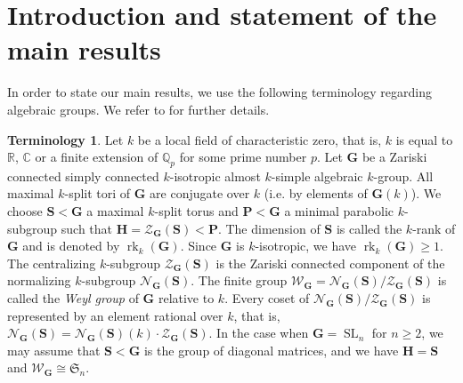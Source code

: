 \documentclass[11pt]{amsart}
\numberwithin{equation}{section}
\theoremstyle{plain}
\theoremstyle{definition}
\newtheorem*{terminology}{Terminology}
\newcommand{\R}{\mathbb{R}}
\newcommand{\C}{\mathbb{C}}
\newcommand{\Q}{\mathbb{Q}}
\newcommand{\SL}{\operatorname{SL}}
\newcommand{\rk}{\operatorname{rk}}
\begin{document}
\section{Introduction and statement of the main results}

In order to state our main results, we use the following terminology regarding algebraic groups. We refer to \cite{Bo91, Ma91} for further details.


\begin{terminology}
Let $k$ be a local field of characteristic zero, that is, $k$ is equal to $\R$, $\C$ or a finite extension of $\Q_p$ for some prime number $p$. Let $\mathbf G$ be a Zariski connected simply connected $k$-isotropic almost $k$-simple algebraic $k$-group. All maximal $k$-split tori of $\mathbf G$ are conjugate over $k$ (i.e.\! by elements of $\mathbf G(k)$). We choose $\mathbf S < \mathbf G$ a maximal $k$-split torus and $\mathbf P < \mathbf G$ a minimal parabolic $k$-subgroup such that $\mathbf H = \mathscr Z_{\mathbf G}(\mathbf S) < \mathbf P$. The dimension of $\mathbf S$ is called the $k$-rank of $\mathbf G$ and is denoted by $\rk_k(\mathbf G)$. Since $\mathbf G$ is $k$-isotropic, we have $\rk_k(\mathbf G) \geq 1$. The centralizing $k$-subgroup $\mathscr Z_{\mathbf G}(\mathbf S)$ is the Zariski connected component of the normalizing $k$-subgroup $\mathscr N_{\mathbf G}(\mathbf S)$. The finite group
$\mathscr W_{\mathbf G} = \mathscr N_{\mathbf G}(\mathbf S)/\mathscr Z_{\mathbf G}(\mathbf S)$ is called the {\em Weyl group} of $\mathbf G$ relative to $k$. Every coset of $\mathscr N_{\mathbf G}(\mathbf S)/\mathscr Z_{\mathbf G}(\mathbf S)$ is represented by an element rational over $k$, that is, $\mathscr N_{\mathbf G}(\mathbf S) = \mathscr N_{\mathbf G}(\mathbf S)(k) \cdot \mathscr Z_{\mathbf G}(\mathbf S)$. In the case when $\mathbf G = \SL_n$ for $n \geq 2$, we may assume that $\mathbf S < \mathbf G$ is the group of diagonal matrices, and we have $\mathbf H = \mathbf S$ and $\mathscr W_{\mathbf G} \cong \mathfrak S_n$.
\end{terminology}
\end{document}
